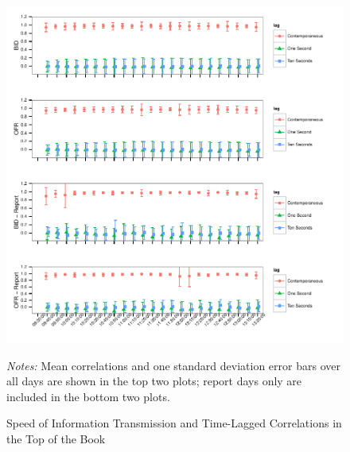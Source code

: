 \documentclass[review,12pt]{elsarticle}
\begin{document}
\begin{figure}[htbp]
\includegraphics[scale=0.95]{TablesFigures_files/figure-latex/unnamed-chunk-5-1.pdf}
{\footnotesize  \emph{Notes:} Mean correlations and one standard deviation error bars over all days
are shown in the top two plots; report days only are included in the
bottom two plots. \par}
\caption{Speed of Information Transmission and Time-Lagged Correlations
in the Top of the Book}
\end{figure}


\clearpage
\end{document}
